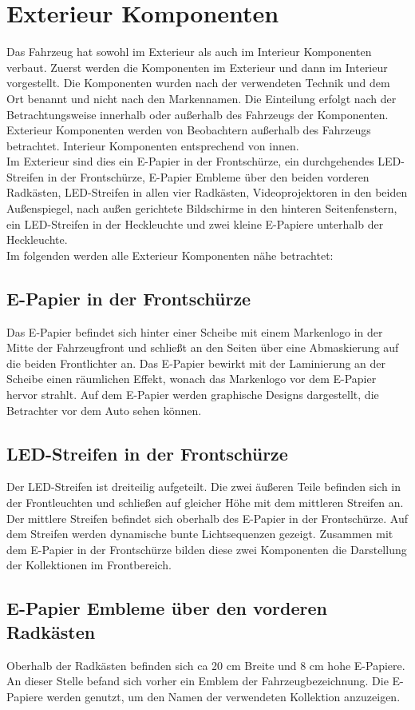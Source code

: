 \section{Exterieur Komponenten}
Das Fahrzeug hat sowohl im Exterieur als auch im Interieur Komponenten verbaut. Zuerst werden die Komponenten im Exterieur und dann im Interieur vorgestellt. Die Komponenten wurden nach der verwendeten Technik und dem Ort benannt und nicht nach den Markennamen. Die Einteilung erfolgt nach der Betrachtungsweise innerhalb oder außerhalb des Fahrzeugs der Komponenten. Exterieur Komponenten werden von Beobachtern außerhalb des Fahrzeugs betrachtet. Interieur Komponenten entsprechend von innen.\\
Im Exterieur sind dies ein E-Papier in der Frontschürze, ein durchgehendes LED-Streifen in der Frontschürze, E-Papier Embleme über den beiden vorderen Radkästen, LED-Streifen in allen vier Radkästen, Videoprojektoren in den beiden Außenspiegel, nach außen gerichtete Bildschirme in den hinteren Seitenfenstern, ein LED-Streifen in der Heckleuchte und zwei kleine E-Papiere unterhalb der Heckleuchte.\\
Im folgenden werden alle Exterieur Komponenten nähe betrachtet:
\subsection{E-Papier in der Frontschürze}
Das E-Papier befindet sich hinter einer Scheibe mit einem Markenlogo in der Mitte der Fahrzeugfront und schließt an den Seiten über eine Abmaskierung auf die beiden Frontlichter an. Das E-Papier bewirkt mit der Laminierung an der Scheibe einen räumlichen Effekt, wonach das Markenlogo vor dem E-Papier hervor strahlt.
Auf dem E-Papier werden graphische Designs dargestellt, die Betrachter vor dem Auto sehen können.
\subsection{LED-Streifen in der Frontschürze}
Der LED-Streifen ist dreiteilig aufgeteilt. Die zwei äußeren Teile befinden sich in der Frontleuchten und schließen auf gleicher Höhe mit dem mittleren Streifen an. Der mittlere Streifen befindet sich oberhalb des E-Papier in der Frontschürze.
Auf dem Streifen werden dynamische bunte Lichtsequenzen gezeigt.
Zusammen mit dem E-Papier in der Frontschürze bilden diese zwei Komponenten die Darstellung der Kollektionen im Frontbereich.
\subsection{E-Papier Embleme über den vorderen Radkästen}
Oberhalb der Radkästen befinden sich ca 20 cm Breite und 8 cm hohe E-Papiere. An dieser Stelle befand sich vorher ein Emblem der Fahrzeugbezeichnung.
Die E-Papiere werden genutzt, um den Namen der verwendeten Kollektion anzuzeigen.
